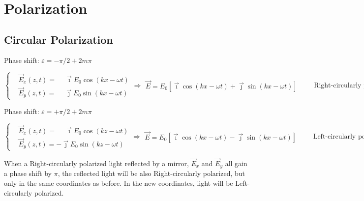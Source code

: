 \chapter{Polarization}

\section{Circular Polarization}

Phase shift: $\varepsilon = - \pi/2 + 2 m \pi$

\begin{equation*}
  \left\{
    \begin{aligned}
      & \vec{E}_x \left( z,t \right) = \phantom{+} \vec{\imath} E_0 \cos \left( k x - \omega t \right) \\
      & \vec{E}_y \left( z,t \right) = \phantom{+} \vec{\jmath} E_0 \sin \left( k x - \omega t \right)
    \end{aligned}
  \right.
  \Rightarrow 
  \begin{aligned}
    \vec{E} = E_0 \left[ \vec{\imath} \cos \left( k x - \omega t \right) + \vec{\jmath} \sin \left( k x - \omega t \right) \right]
  \end{aligned}
  \quad\quad \text{Right-circularly polarized}
\end{equation*}

Phase shift: $\varepsilon = + \pi/2 + 2 m \pi$

\begin{equation*}
  \left\{
    \begin{aligned}
      & \vec{E}_x \left( z,t \right) = \phantom{+} \vec{\imath} E_0 \cos \left( k z - \omega t \right) \\
      & \vec{E}_y \left( z,t \right) = - \vec{\jmath} E_0 \sin \left( k z - \omega t \right)
    \end{aligned}
  \right.
  \Rightarrow 
  \begin{aligned}
    \vec{E} = E_0 \left[ \vec{\imath} \cos \left( k x - \omega t \right) - \vec{\jmath} \sin \left( k x - \omega t \right) \right]
  \end{aligned}
  \quad\quad \text{Left-circularly polarized}
\end{equation*}

When a Right-circularly polarized light reflected by a mirror, $\vec{E}_x$ and $\vec{E}_y$ all gain a phase shift by $\pi$, the reflected light will be also Right-circularly polarized, but only in the same coordinates as before. In the new coordinates, light will be Left-circularly polarized. 

